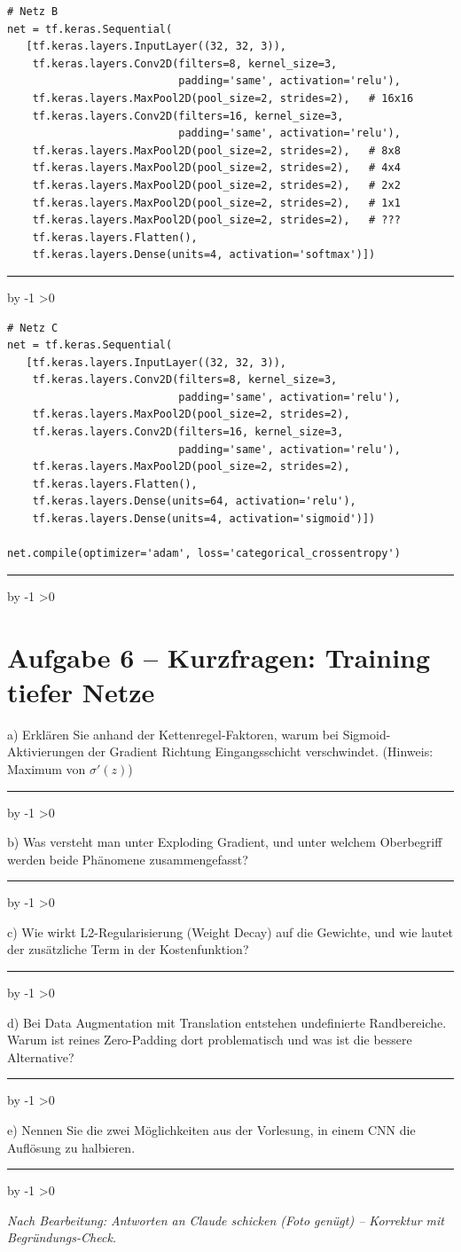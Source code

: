 \documentclass[10pt,a4paper]{article}
\newcommand{\antwortlinien}[1]{%
  \par\vspace{2pt}%
  \newcount\zeilen \zeilen=#1
  \loop
    \noindent\rule{\linewidth}{0.4pt}\par\vspace{11pt}%
    \advance\zeilen by -1
  \ifnum\zeilen>0 \repeat
}
\begin{document}
\Needspace*{8cm}
\begin{lstlisting}
# Netz B
net = tf.keras.Sequential(
   [tf.keras.layers.InputLayer((32, 32, 3)),
    tf.keras.layers.Conv2D(filters=8, kernel_size=3,
                           padding='same', activation='relu'),
    tf.keras.layers.MaxPool2D(pool_size=2, strides=2),   # 16x16
    tf.keras.layers.Conv2D(filters=16, kernel_size=3,
                           padding='same', activation='relu'),
    tf.keras.layers.MaxPool2D(pool_size=2, strides=2),   # 8x8
    tf.keras.layers.MaxPool2D(pool_size=2, strides=2),   # 4x4
    tf.keras.layers.MaxPool2D(pool_size=2, strides=2),   # 2x2
    tf.keras.layers.MaxPool2D(pool_size=2, strides=2),   # 1x1
    tf.keras.layers.MaxPool2D(pool_size=2, strides=2),   # ???
    tf.keras.layers.Flatten(),
    tf.keras.layers.Dense(units=4, activation='softmax')])
\end{lstlisting}
\antwortlinien{3}

\Needspace*{6cm}
\begin{lstlisting}
# Netz C
net = tf.keras.Sequential(
   [tf.keras.layers.InputLayer((32, 32, 3)),
    tf.keras.layers.Conv2D(filters=8, kernel_size=3,
                           padding='same', activation='relu'),
    tf.keras.layers.MaxPool2D(pool_size=2, strides=2),
    tf.keras.layers.Conv2D(filters=16, kernel_size=3,
                           padding='same', activation='relu'),
    tf.keras.layers.MaxPool2D(pool_size=2, strides=2),
    tf.keras.layers.Flatten(),
    tf.keras.layers.Dense(units=64, activation='relu'),
    tf.keras.layers.Dense(units=4, activation='sigmoid')])

net.compile(optimizer='adam', loss='categorical_crossentropy')
\end{lstlisting}
\antwortlinien{3}

\section*{Aufgabe 6 -- Kurzfragen: Training tiefer Netze}

a) Erklären Sie anhand der Kettenregel-Faktoren, warum bei Sigmoid-Aktivierungen der
Gradient Richtung Eingangsschicht verschwindet. (Hinweis: Maximum von $\sigma'(z)$)
\antwortlinien{3}

b) Was versteht man unter Exploding Gradient, und unter welchem Oberbegriff werden
beide Phänomene zusammengefasst?
\antwortlinien{2}

c) Wie wirkt L2-Regularisierung (Weight Decay) auf die Gewichte, und wie lautet der
zusätzliche Term in der Kostenfunktion?
\antwortlinien{3}

d) Bei Data Augmentation mit Translation entstehen undefinierte Randbereiche.
Warum ist reines Zero-Padding dort problematisch und was ist die bessere Alternative?
\antwortlinien{3}

e) Nennen Sie die zwei Möglichkeiten aus der Vorlesung, in einem CNN die Auflösung zu
halbieren.
\antwortlinien{2}

\vspace{10pt}
\begin{center}
\footnotesize\itshape
Nach Bearbeitung: Antworten an Claude schicken (Foto genügt) -- Korrektur mit Begründungs-Check.
\end{center}
\end{document}
